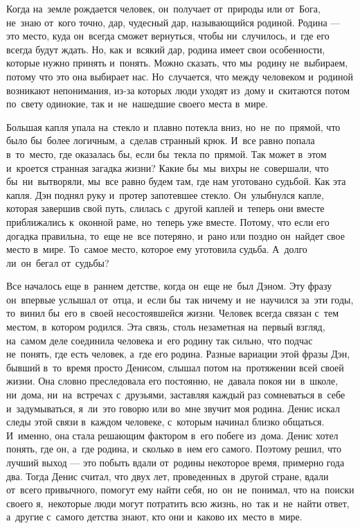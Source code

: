 Когда на~земле рождается человек, он~получает от~природы или от~Бога, не~знаю от~кого точно, дар, чудесный дар, называющийся родиной.
Родина --- это место, куда он~всегда сможет вернуться, чтобы ни~случилось, и~где его всегда будут ждать.
Но, как и~всякий дар, родина имеет свои особенности, которые нужно принять и~понять.
Можно сказать, что мы~родину не~выбираем, потому что это она выбирает нас.
Но~случается, что между человеком и~родиной возникают непонимания, из-за которых люди уходят из~дому и~скитаются потом по~свету одинокие, так и~не~нашедшие своего места в~мире.
 
Большая капля упала на~стекло и~плавно потекла вниз, но~не~по~прямой, что было бы~более логичным, а~сделав странный крюк.
И~все равно попала в~то~место, где оказалась бы, если бы~текла по~прямой.
Так может в~этом и~кроется странная загадка жизни? Какие бы~мы~вихры не~совершали, что бы~ни~вытворяли, мы~все равно будем там, где нам уготовано судьбой.
Как эта капля.
Дэн поднял руку и~протер запотевшее стекло.
Он~улыбнулся капле, которая завершив свой путь, слилась с~другой каплей и~теперь они вместе приближались к~оконной раме, но~теперь уже вместе.
Потому, что если его догадка правильна, то~еще не~все потеряно, и~рано или поздно он~найдет свое место в~мире.
То~самое место, которое ему уготовила судьба.
А~долго ли~он~бегал от~судьбы?
 
Все началось еще в~раннем детстве, когда он~еще не~был Дэном.
Эту фразу он~впервые услышал от~отца, и~если бы~так ничему и~не~научился за~эти годы, то~винил бы~его в~своей несостоявшейся жизни.
Человек всегда связан с~тем местом, в~котором родился.
Эта связь, столь незаметная на~первый взгляд, на~самом деле соединила человека и~его родину так сильно, что подчас не~понять, где есть человек, а~где его родина.
Разные вариации этой фразы Дэн, бывший в~то~время просто Денисом, слышал потом на~протяжении всей своей жизни.
Она словно преследовала его постоянно, не~давала покоя ни~в~школе, ни~дома, ни~на~встречах с~друзьями, заставляя каждый раз сомневаться в~себе и~задумываться, я~ли~это говорю или во~мне звучит моя родина.
Денис искал следы этой связи в~каждом человеке, с~которым начинал близко общаться.
И~именно, она стала решающим фактором в~его побеге из~дома.
Денис хотел понять, где он, а~где родина, и~сколько в~нем его самого.
Поэтому решил, что лучший выход --- это побыть вдали от~родины некоторое время, примерно года два.
Тогда Денис считал, что двух лет, проведенных в~другой стране, вдали от~всего привычного, помогут ему найти себя, но~он~не~понимал, что на~поиски своего я,~некоторые люди могут потратить всю жизнь, но~так и~не~найти ответ, а~другие с~самого детства знают, кто они и~каково их~место в~мире.

